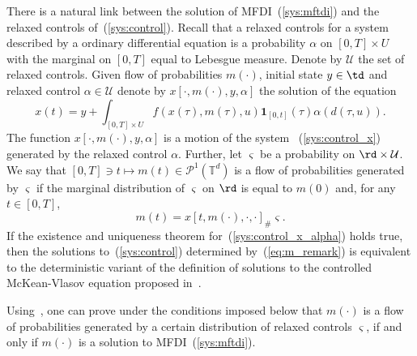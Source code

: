\documentclass[12pt]{article}
\newcommand{\ptd}{\mathcal{P}^1(\mathbb{T}^d)}
\begin{document}
\begin{remark}
	There is a natural link between the solution of MFDI~(\ref{sys:mftdi}) and the relaxed controls of~(\ref{sys:control}).  
	Recall that a relaxed controls for a system described by a ordinary differential equation is a probability  $\alpha$ on $[0,T]\times U$ with the marginal on $[0,T]$ equal to Lebesgue measure. Denote by $\mathcal{U}$ the set of relaxed controls.  Given flow of probabilities $m(\cdot)$, initial state $y\in\td$ and relaxed control $\alpha\in \mathcal{U}$ denote by $x[\cdot,m(\cdot),y,\alpha]$ the solution of the equation
	\begin{equation}\label{sys:control_x_alpha}
	x(t)=y+\int_{[0,T]\times U}f(x(\tau),m(\tau),u)\mathbf{1}_{[0,t]}(\tau)\alpha(d(\tau,u)). 
	\end{equation} The function $x[\cdot,m(\cdot),y,\alpha]$ is a motion of the system ~(\ref{sys:control_x}) generated by the relaxed control $\alpha$. Further, let $\varsigma$ be a probability on $\rd\times \mathcal{U}$. We say that $[0,T]\ni t\mapsto m(t)\in\ptd$ is a flow of probabilities generated by $\varsigma$ if the marginal distribution of $\varsigma$ on $\rd$ is equal to $m(0)$ and, for any $t\in [0,T]$,
	\begin{equation}\label{eq:m_remark}
	m(t)=x[t,m(\cdot),\cdot,\cdot]_\#\varsigma. 
	\end{equation} If the existence and uniqueness theorem for~(\ref{sys:control_x_alpha}) holds true, then the solutions to~(\ref{sys:control}) determined by~(\ref{eq:m_remark})  is equivalent to the deterministic variant of the definition of  solutions to the controlled McKean-Vlasov equation proposed in~\cite{Lacker_limit}.
	
	Using~\cite[Theorem VI.3.1]{Warga}, one can prove under the conditions imposed below that $m(\cdot)$ is a flow of probabilities generated by a certain distribution of relaxed controls $\varsigma$, if and only if $m(\cdot)$ is a solution to MFDI~(\ref{sys:mftdi}).
\end{remark}
\end{document}
